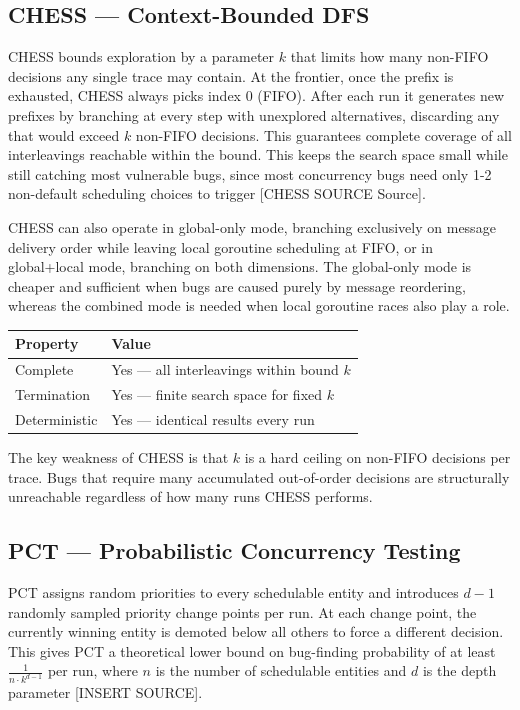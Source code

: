 \documentclass[11pt]{article}
\begin{document}
\subsection{CHESS --- Context-Bounded DFS}

CHESS bounds exploration by a parameter $k$ that limits how many non-FIFO decisions any single trace may contain. At the frontier, once the prefix is exhausted, CHESS always picks index 0 (FIFO). After each run it generates new prefixes by branching at every step with unexplored alternatives, discarding any that would exceed $k$ non-FIFO decisions. This guarantees complete coverage of all interleavings reachable within the bound. This keeps the search space small while still catching most vulnerable bugs, since most concurrency bugs need only 1-2 non-default scheduling choices to trigger [CHESS SOURCE Source].


CHESS can also operate in global-only mode, branching exclusively on message delivery order while leaving local goroutine scheduling at FIFO, or in global+local mode, branching on both dimensions. The global-only mode is cheaper and sufficient when bugs are caused purely by message reordering, whereas the combined mode is needed when local goroutine races also play a role.

\begin{center}
\begin{tabular}{@{}ll@{}}
\toprule
Property & Value \\
\midrule
Complete & Yes --- all interleavings within bound $k$ \\
Termination & Yes --- finite search space for fixed $k$ \\
Deterministic & Yes --- identical results every run \\
\bottomrule
\end{tabular}
\end{center}

The key weakness of CHESS is that $k$ is a hard ceiling on non-FIFO decisions per trace. Bugs that require many accumulated out-of-order decisions are structurally unreachable regardless of how many runs CHESS performs.

\subsection{PCT --- Probabilistic Concurrency Testing}

PCT assigns random priorities to every schedulable entity and introduces $d - 1$ randomly sampled priority change points per run. At each change point, the currently winning entity is demoted below all others to force a different decision. This gives PCT a theoretical lower bound on bug-finding probability of at least $\frac{1}{n \cdot k^{d-1}}$ per run, where $n$ is the number of schedulable entities and $d$ is the depth parameter [INSERT SOURCE].
\end{document}
